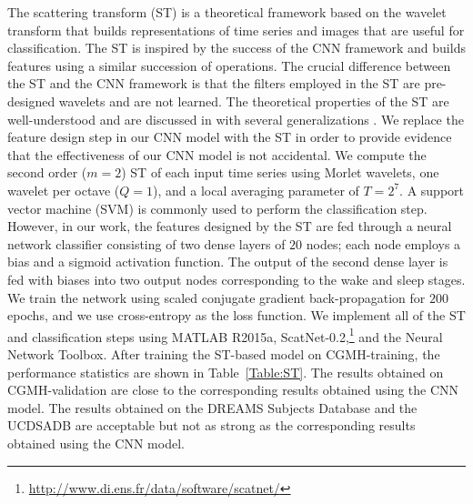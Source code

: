 \documentclass[10pt,a4paper,english]{amsart}
\begin{document}
The scattering transform (ST) \cite{Mallat2012} is a theoretical framework based on the wavelet transform that builds representations of time series and images that are useful for classification.   The ST is inspired by the success of the CNN framework and builds features using a similar succession of operations. The crucial difference between the ST and the CNN framework is that the filters employed in the ST are pre-designed wavelets and are not learned. The theoretical properties of the ST are well-understood and are discussed in \cite{Mallat2012} with several generalizations \cite{Czaja_Li:2018,Qiu2018}. We replace the feature design step in our CNN model with the ST in order to provide evidence that the effectiveness of our CNN model is not accidental. 
%
We compute the second order ($m = 2$) ST of each input time series using Morlet wavelets, one wavelet per octave ($Q = 1$), and a local averaging parameter of $T = 2^7$.  A support vector machine (SVM) is commonly used to perform the classification step. However, in our work, the features designed by the ST are fed through a neural network classifier consisting of two dense layers of $20$ nodes; each node employs a bias and a sigmoid activation function. The output of the second dense layer is fed with biases into two output nodes corresponding to the wake and sleep stages. We train the network using scaled conjugate gradient back-propagation for $200$ epochs, and we use cross-entropy as the loss function. We implement all of the ST and classification steps using MATLAB R2015a, ScatNet-0.2,\footnote{\url{http://www.di.ens.fr/data/software/scatnet/}} and the Neural Network Toolbox.  After training the ST-based model on CGMH-training, the performance statistics are shown in Table~\ref{Table:ST}. The results obtained on CGMH-validation are close to the corresponding results obtained using the CNN model. The results obtained on the DREAMS Subjects Database and the UCDSADB are acceptable but not as strong as the corresponding results obtained using the CNN model.  
\end{document}
